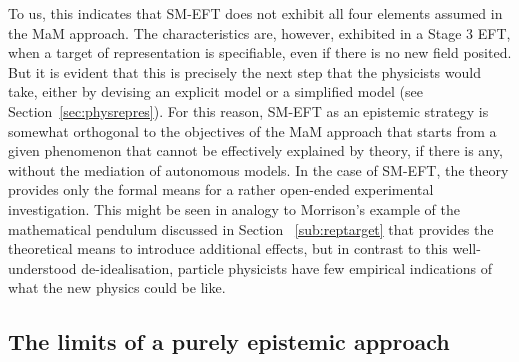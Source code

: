 To us, this indicates that SM-EFT does not exhibit all four elements assumed in the MaM approach. 
The characteristics are, however, exhibited in a Stage 3 EFT, when a target of representation is specifiable, even if there is no new field posited.  
But it is evident that this is precisely the next step that the physicists would take, either by devising an explicit model or a simplified model (see Section~\ref{sec:physrepres}). 
For this reason, SM-EFT as an epistemic strategy is somewhat orthogonal to the objectives of the MaM approach that starts from a given phenomenon that cannot be effectively explained by theory, if there is any, without the mediation of autonomous models. In the case of SM-EFT, the theory provides only the formal means for a rather open-ended experimental investigation. 
This might be seen in analogy to Morrison's example of the mathematical pendulum discussed in Section ~\ref{sub:reptarget} that provides the theoretical means to introduce additional effects, but in contrast to this well-understood de-idealisation, particle physicists have few empirical indications of what the new physics could be like.


\subsection{The limits of a purely epistemic approach} \label{sub:epistemic}

